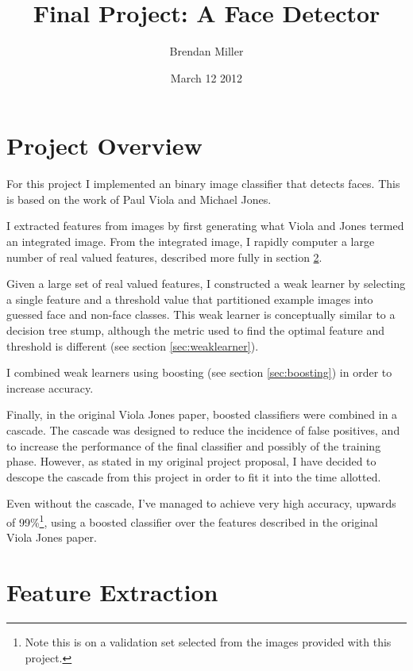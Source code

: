 \documentclass[11pt,twocolumn]{article}
\title{Final Project: A Face Detector}
\author{Brendan Miller}
\date{March 12 2012}
\begin{document}

\section{Project Overview}

For this project I implemented an binary image classifier that detects
faces. This is based on the work of Paul Viola and Michael
Jones\cite{violajones2001}.

I extracted features from images by first generating what Viola and
Jones termed an integrated image. From the integrated image, I rapidly
computer a large number of real valued features, described more fully
in section \ref{sec:features}.

Given a large set of real valued features, I constructed a weak
learner by selecting a single feature and a threshold value that
partitioned example images into guessed face and non-face classes. This
weak learner is conceptually similar to a decision tree stump,
although the metric used to find the optimal feature and threshold is
different (see section \ref{sec:weaklearner}).

I combined weak learners using boosting (see section
\ref{sec:boosting}) in order to increase accuracy.

Finally, in the original Viola Jones paper, boosted classifiers were
combined in a cascade. The cascade was designed to reduce the
incidence of false positives, and to increase the performance of the
final classifier and possibly of the training phase. However, as stated
in my original project proposal, I have decided to descope the cascade
from this project in order to fit it into the time allotted.

Even without the cascade, I've managed to achieve very high accuracy,
upwards of 99\%\footnote{Note this is on a validation set selected
  from the images provided with this project.}, using a
boosted classifier over the features described in the original Viola
Jones paper.

\section{Feature Extraction}
\label{sec:features}
\end{document}
